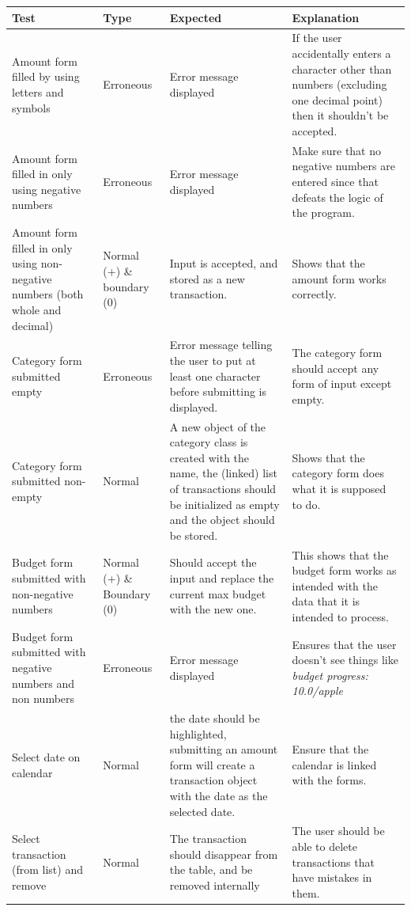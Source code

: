 \documentclass{article}
\begin{document}
\begin{longtable}{|p{3cm}|p{2cm}|p{3cm}|p{4cm}|}
    \hline
    Test & Type & Expected & Explanation\\
    \hline
    Amount form filled by using letters and symbols & Erroneous & Error message displayed & If the user accidentally enters a character other than numbers (excluding one decimal point) then it shouldn't be accepted.\\
    \hline
    Amount form filled in only using negative numbers & Erroneous & Error message displayed & Make sure that no negative numbers are entered since that defeats the logic of the program.\\
    \hline
    Amount form filled in only using non-negative numbers (both whole and decimal) & Normal (+) \& boundary (0) & Input is accepted, and stored as a new transaction. & Shows that the amount form works correctly.\\
    \hline
    Category form submitted empty & Erroneous & Error message telling the user to put at least one character before submitting is displayed. & The category form should accept any form of input except empty.\\
    \hline
    Category form submitted non-empty & Normal & A new object of the category class is created with the name, the (linked) list of transactions should be initialized as empty and the object should be stored. & Shows that the category form does what it is supposed to do.\\
    \hline
    Budget form submitted with non-negative numbers & Normal (+) \& Boundary (0) & Should accept the input and replace the current max budget with the new one. & This shows that the budget form works as intended with the data that it is intended to process.\\
    \hline
    Budget form submitted with negative numbers and non numbers & Erroneous & Error message displayed & Ensures that the user doesn't see things like \textit{budget progress: 10.0/apple}\\
    \hline
    Select date on calendar & Normal & the date should be highlighted, submitting an amount form will create a transaction object with the date as the selected date. & Ensure that the calendar is linked with the forms.\\
    \hline
    Select transaction (from list) and remove & Normal & The transaction should disappear from the table, and be removed internally & The user should be able to delete transactions that have mistakes in them.\\

\end{longtable}
\end{document}
